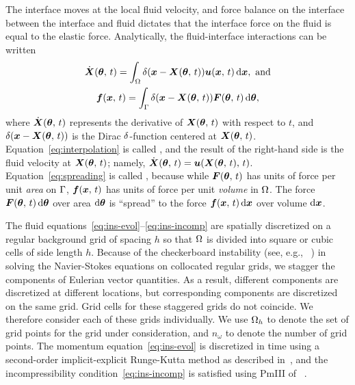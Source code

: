 The interface moves at the local fluid velocity, and force balance on the interface
between the interface and fluid dictates that the interface force on the fluid is equal
to the elastic force. Analytically, the fluid-interface interactions can be written
\begin{gather}
    \label{eq:interpolation}
    \U(\params,\,t) = \int_\domain \Dirac(\x-\X(\params,\,t)) \u(\x,\,t)\d\x,\ \text{and} \\
    \label{eq:spreading}
    \f(\x,\,t) = \int_\interface \Dirac(\x-\X(\params,\,t))\F(\params,\,t)\d\params,
\end{gather}
where $\dot{\boldsymbol{X}}(\boldsymbol{\theta},\,t)$ represents the derivative of $\boldsymbol{X}(\boldsymbol{\theta},\,t)$ with respect to
$t$, and $\delta(\boldsymbol{x}-\boldsymbol{X}(\boldsymbol{\theta},\,t))$ is the Dirac $\delta$-function centered at
$\boldsymbol{X}(\boldsymbol{\theta},\,t)$. Equation~\eqref{eq:interpolation} is called , and
the result of the right-hand side is the fluid velocity at $\boldsymbol{X}(\boldsymbol{\theta},\,t)$; namely,
$\dot{\boldsymbol{X}}(\boldsymbol{\theta},\,t) = \boldsymbol{u}(\boldsymbol{X}(\boldsymbol{\theta},\,t),\,t)$. Equation~\eqref{eq:spreading} is called
, because while $\boldsymbol{F}(\boldsymbol{\theta},\,t)$ has units of force per unit \emph{area}
on $\Gamma$, $\boldsymbol{f}(\boldsymbol{x},\,t)$ has units of force per unit \emph{volume} in $\Omega$. The
force $\F(\params,\,t)\d\params$ over area $\d\params$ is ``spread'' to the force
$\f(\x,\,t)\d\x$ over volume $\d\x$. 

The fluid equations~\eqref{eq:ins-evol}--\eqref{eq:ins-incomp} are spatially discretized
on a regular background grid of spacing $h$ so that $\Omega$ is divided into square or
cubic cells of side length $h$. Because of the checkerboard instability (see, e.g.,~%
\cite{Wesseling:2001ci}) in solving the Navier-Stokes equations on collocated regular
grids, we stagger the components of Eulerian vector quantities. As a result, different
components are discretized at different locations, but corresponding components are
discretized on the same grid. Grid cells for these staggered grids do not coincide. We
therefore consider each of these grids individually. We use $\Omega_h$ to denote the set
of grid points for the grid under consideration, and $n_\omega$ to denote the number of
grid points. The momentum equation~\eqref{eq:ins-evol} is discretized in time using a
second-order implicit-explicit Runge-Kutta method as described in~\cite{Peskin:2002go},
and the incompressibility condition~\eqref{eq:ins-incomp} is satisfied using PmIII of~%
\cite{Brown:2001bq}.

